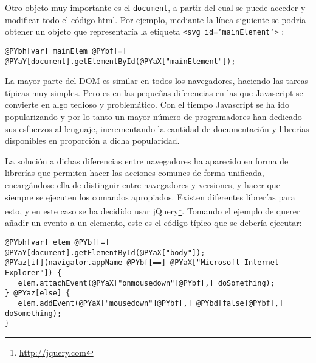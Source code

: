 Otro objeto muy importante es el \texttt{document}, a partir del cual se puede acceder y modificar todo el código html. Por ejemplo, mediante la línea siguiente se podría obtener un objeto que representaría la etiqueta \texttt{<svg id=`mainElement`>} :

\begin{Verbatim}[commandchars=@\[\]]
@PYbh[var] mainElem @PYbf[=] @PYaY[document].getElementById(@PYaX["mainElement"]);
\end{Verbatim}


La mayor parte del DOM es similar en todos los navegadores, haciendo las tareas típicas muy simples. Pero es en las pequeñas diferencias en las que Javascript se convierte en algo tedioso y problemático. Con el tiempo Javascript se ha ido popularizando y por lo tanto un mayor número de programadores han dedicado sus esfuerzos al lenguaje, incrementando la cantidad de documentación y librerías disponibles en proporción a dicha popularidad.

La solución a dichas diferencias entre navegadores ha aparecido en forma de librerías que permiten hacer las acciones comunes de forma unificada, encargándose ella de distinguir entre navegadores y versiones, y hacer que siempre se ejecuten los comandos apropiados. Existen diferentes librerías para esto, y en este caso se ha decidido usar jQuery\footnote{\url{http://jquery.com}}. Tomando el ejemplo de querer añadir un evento a un elemento, este es el código típico que se debería ejecutar:

\begin{Verbatim}[commandchars=@\[\]]
@PYbh[var] elem @PYbf[=] @PYaY[document].getElementById(@PYaX["body"]);
@PYaz[if](navigator.appName @PYbf[==] @PYaX["Microsoft Internet Explorer"]) {
   elem.attachEvent(@PYaX["onmousedown"]@PYbf[,] doSomething);
} @PYaz[else] {
   elem.addEvent(@PYaX["mousedown"]@PYbf[,] @PYbd[false]@PYbf[,] doSomething);
}
\end{Verbatim}


